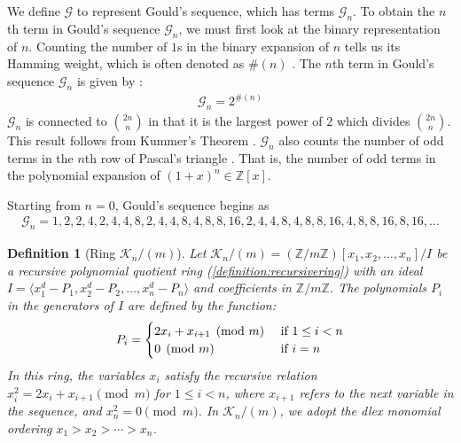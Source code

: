 \documentclass[12pt,reqno]{article}
\theoremstyle{plain}
\newtheorem{definition}[theorem]{Definition}
\newcommand{\Z}{\mathbb{Z}}
\newcommand{\K}{\mathcal{K}}
\newcommand{\wt}[1]{\#(#1)}
\newcommand{\Goulds}{\mathcal{G}}
\begin{document}
We define $\Goulds$ to represent Gould's sequence, which has terms $\Goulds_n$. To obtain the $n$th term in Gould's sequence $\Goulds_n$, we must first look at the binary representation of $n$. Counting the number of $1$s in the binary expansion of $n$ tells us its Hamming weight, which is often denoted as $\wt{n}$ \cite{Lin2004}. The $n$th term in Gould's sequence $\Goulds_n$ is given by \cite{A001316}:
\begin{align*}
    \Goulds_n = 2^{\wt{n}}
\end{align*}
$\Goulds_n$ is connected to $\binom{2n}{n}$ in that it is the largest power of $2$ which divides $\binom{2n}{n}$. This result follows from Kummer's Theorem \cite{Kummer1852}. $\Goulds_n$ also counts the number of odd terms in the $n$th row of Pascal's triangle \cite{Glaisher1899}. That is, the number of odd terms in the polynomial expansion of $(1+x)^n \in \Z[x]$.

Starting from $n=0$, Gould's sequence begins as
\begin{align*}
    \Goulds_n = 1, 2, 2, 4, 2, 4, 4, 8, 2, 4, 4, 8, 4, 8, 8, 16, 2, 4, 4, 8, 4, 8, 8, 16, 4, 8, 8, 16, 8, 16, \ldots
\end{align*}

\begin{definition}[Ring $\K_n/(m)$] \label{definition:modring}
Let $\K_n/(m) = (\Z/m\Z)[x_1, x_2, \ldots, x_n]/I$ be a recursive polynomial quotient ring (\cref{definition:recursivering}) with an ideal $I = \langle x_1^d - P_1, x_2^d - P_2, \ldots, x_n^d - P_n \rangle$ and coefficients in $\Z/m\Z$. The polynomials $P_i$ in the generators of $I$ are defined by the function:
\begin{displaymath}
P_i =
\begin{cases}
    2x_i + x_{i+1} \pmod{m} & \textup{ if } 1 \leq i < n \\
    0 \pmod{m} &\textup{ if } i = n
\end{cases}
\end{displaymath}
In this ring, the variables $x_i$ satisfy the recursive relation $x_i^2 = 2x_i + x_{i+1} \pmod{m}$ for $1 \leq i < n$, where $x_{i+1}$ refers to the next variable in the sequence, and $x_n^2 = 0 \pmod{m}$. In $\K_n/(m)$, we adopt the dlex monomial ordering $x_1 > x_2 > \cdots > x_n$.
\end{definition}
\end{document}
